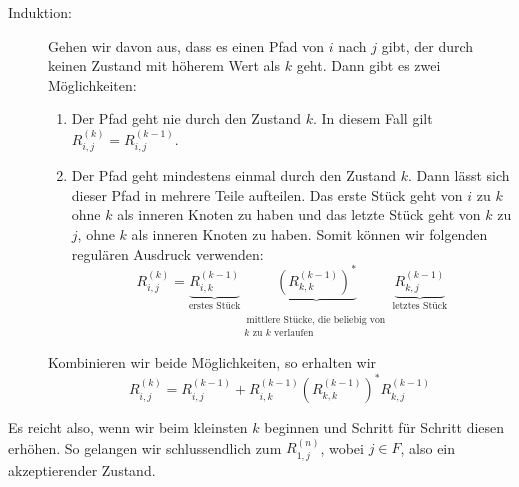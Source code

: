 \begin{description}
  \item[Induktion:] Gehen wir davon aus, dass es einen Pfad von \(i\) nach \(j\) gibt, der durch keinen Zustand mit höherem Wert als \(k\) geht. Dann gibt es zwei Möglichkeiten:
  \begin{enumerate}
    \item Der Pfad geht nie durch den Zustand \(k\). In diesem Fall gilt \(R_{i, j}^{(k)} = R_{i, j}^{(k-1)}\).
    \item Der Pfad geht mindestens einmal durch den Zustand \(k\). Dann lässt sich dieser Pfad in mehrere Teile aufteilen. Das erste Stück geht von \(i\) zu \(k\) ohne \(k\) als inneren Knoten zu haben und das letzte Stück geht von \(k\) zu \(j\), ohne \(k\) als inneren Knoten zu haben. Somit können wir folgenden regulären Ausdruck verwenden:
    \[
    R_{i, j}^{(k)} = 
      \underbrace{R_{i, k}^{(k -1)}}_{\text{erstes Stück}}
      \underbrace{(R_{k, k}^{(k-1)})^*}_{\substack{\\ \ \\ \ \text{mittlere Stücke, die beliebig von }\\ k \text{ zu } k \text{ verlaufen}}}
      \underbrace{R_{k, j}^{(k-1)}}_{\text{letztes Stück}}
    \]
  \end{enumerate}
  Kombinieren wir beide Möglichkeiten, so erhalten wir
  \[
    R_{i, j}^{(k)} = R_{i, j}^{(k - 1)} + R_{i, k}^{(k-1)} (R_{k,k}^{(k-1)})^* R_{k, j}^{(k-1)}
  \]
\end{description}

Es reicht also, wenn wir beim kleinsten \(k\) beginnen und Schritt für Schritt diesen erhöhen. So gelangen wir schlussendlich zum \(R_{1, j}^{(n)}\), wobei \(j \in F\), also ein akzeptierender Zustand.

